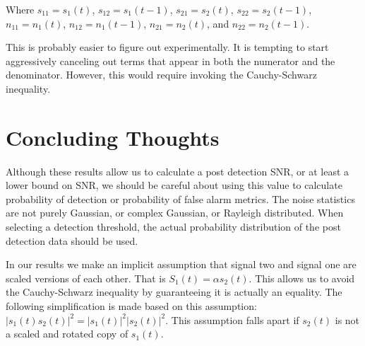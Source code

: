 \documentclass[11pt]{article}
\begin{document}
Where $s_{11} = s_1(t)$, $s_{12} = s_1(t-1)$, $s_{21} = s_2(t)$, $s_{22} = s_2(t-1)$, $n_{11} = n_1(t)$, $n_{12} = n_1(t-1)$, $n_{21} = n_2(t)$, and $n_{22} = n_2(t-1)$.










This is probably easier to figure out experimentally. It is tempting to start aggressively canceling out terms that appear in both the numerator and the denominator. However, this would require invoking the Cauchy-Schwarz inequality.


\section{Concluding Thoughts}

Although these results allow us to calculate a post detection SNR, or at least a lower bound on SNR, we should be careful about using this value to calculate probability of detection or probability of false alarm metrics. The noise statistics are not purely Gaussian, or complex Gaussian, or Rayleigh distributed. When selecting a detection threshold, the actual probability distribution of the post detection data should be used.

In our results we make an implicit assumption that signal two and signal one are scaled versions of each other. That is $S_1(t) = \alpha s_2(t)$. This allows us to avoid the Cauchy-Schwarz inequality by guaranteeing it is actually an equality. The following simplification is made based on this assumption: $|s_1(t)s_2(t)|^2 = |s_1(t)|^2|s_2(t)|^2$. This assumption falls apart if $s_2(t)$ is not a scaled and rotated copy of $s_1(t)$.
\end{document}
